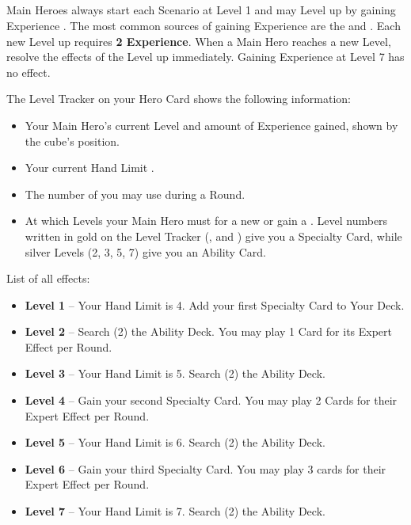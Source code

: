 
\clearpage

\begin{multicols}{2}

\subsection*{}
Main Heroes always start each Scenario at Level 1 and may Level up by gaining Experience .
The most common sources of gaining Experience are the  and .
Each new Level up requires \textbf{2 Experience}.
When a Main Hero reaches a new Level, resolve the effects of the Level up immediately.
Gaining Experience at Level 7 has no effect.\par
The Level Tracker on your Hero Card shows the following information:
\begin{itemize}
\item Your Main Hero's current Level and amount of Experience gained, shown by the cube's position.
\item Your current Hand Limit .
\item The number of   you may use during a Round.
\item At which Levels your Main Hero must  for a new  or gain a .
Level numbers written in gold on the Level Tracker (,  and ) give you a Specialty Card, while silver Levels (2, 3, 5, 7) give you an Ability Card.
\end{itemize}
\vfill\null
\columnbreak
List of all effects:
\begin{itemize}
\item \textbf{Level 1} – Your Hand Limit is 4.
Add your first Specialty Card to Your Deck.
\item \textbf{Level 2} – Search (2) the Ability Deck.
You may play 1 Card for its Expert Effect per Round.
\item \textbf{Level 3} – Your Hand Limit is 5.
Search (2) the Ability Deck.
\item \textbf{Level 4} – Gain your second Specialty Card.
You may play 2 Cards for their Expert Effect per Round.
\item \textbf{Level 5} – Your Hand Limit is 6.
Search (2) the Ability Deck.
\item \textbf{Level 6} – Gain your third Specialty Card.
You may play 3 cards for their Expert Effect per Round.
\item \textbf{Level 7} – Your Hand Limit is 7.
Search (2) the Ability Deck.
\end{itemize}


\end{multicols}
